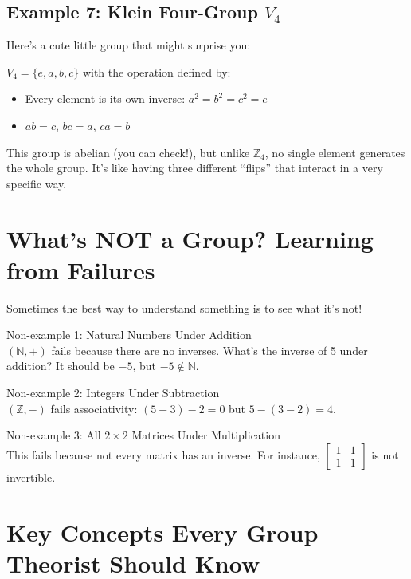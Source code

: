 \documentclass[12pt]{article}
\begin{document}
\subsection{\textcolor{HeaderColor}{Example 7: Klein Four-Group $V_4$}}

\begin{examplebox}
Here's a cute little group that might surprise you:

$V_4 = \{e, a, b, c\}$ with the operation defined by:
\begin{itemize}
\item Every element is its own inverse: $a^2 = b^2 = c^2 = e$
\item $ab = c$, $bc = a$, $ca = b$
\end{itemize}

This group is abelian (you can check!), but unlike $\mathbb{Z}_4$, no single element generates the whole group. It's like having three different ``flips'' that interact in a very specific way.
\end{examplebox}

\section{\textcolor{SectionColor}{What's NOT a Group? Learning from Failures}}

Sometimes the best way to understand something is to see what it's not!

Non-example 1: Natural Numbers Under Addition \\
$(\mathbb{N}, +)$ fails because there are no inverses. What's the inverse of 5 under addition? It should be $-5$, but $-5 \notin \mathbb{N}$.

Non-example 2: Integers Under Subtraction \\
$(\mathbb{Z}, -)$ fails associativity: $(5-3)-2 = 0$ but $5-(3-2) = 4$.

Non-example 3: All $2 \times 2$ Matrices Under Multiplication \\
This fails because not every matrix has an inverse. For instance, $\begin{bmatrix} 1 & 1 \\ 1 & 1 \end{bmatrix}$ is not invertible.

\section{\textcolor{SectionColor}{Key Concepts Every Group Theorist Should Know}}
\end{document}

